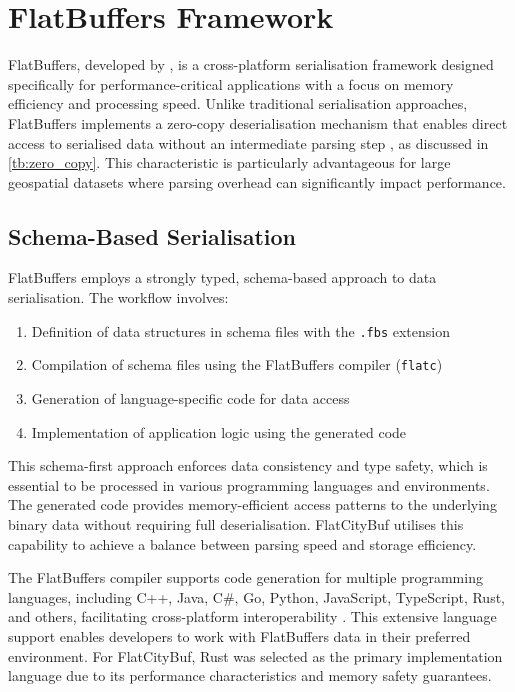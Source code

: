 
\section{FlatBuffers Framework}
\label{tb:flatbuffers}

FlatBuffers, developed by \citet{flatbuffers}, is a cross-platform serialisation framework designed specifically for performance-critical applications with a focus on memory efficiency and processing speed. Unlike traditional serialisation approaches, FlatBuffers implements a zero-copy deserialisation mechanism that enables direct access to serialised data without an intermediate parsing step \citep{flatbuffers_benchmark}, as discussed in \autoref{tb:zero_copy}. This characteristic is particularly advantageous for large geospatial datasets where parsing overhead can significantly impact performance.

\subsection{Schema-Based Serialisation}
\label{tb:flatbuffers:schema_based_serialisation}

FlatBuffers employs a strongly typed, schema-based approach to data serialisation. The workflow involves:

\begin{enumerate}
  \item Definition of data structures in schema files with the \texttt{.fbs} extension
  \item Compilation of schema files using the FlatBuffers compiler (\texttt{flatc})
  \item Generation of language-specific code for data access
  \item Implementation of application logic using the generated code
\end{enumerate}

This schema-first approach enforces data consistency and type safety, which is essential to be processed in various programming languages and environments. The generated code provides memory-efficient access patterns to the underlying binary data without requiring full deserialisation. FlatCityBuf utilises this capability to achieve a balance between parsing speed and storage efficiency.

The FlatBuffers compiler supports code generation for multiple programming languages, including C++, Java, C\#, Go, Python, JavaScript, TypeScript, Rust, and others, facilitating cross-platform interoperability \citep{flatbuffers_support}. This extensive language support enables developers to work with FlatBuffers data in their preferred environment. For FlatCityBuf, Rust was selected as the primary implementation language due to its performance characteristics and memory safety guarantees.

